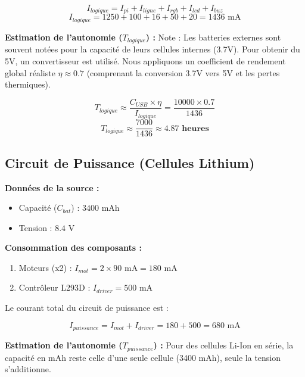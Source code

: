 \begin{equation}
    I_{logique} = I_{pi} + I_{ligne} + I_{rgb} + I_{lcd} + I_{buz}
\end{equation}
\begin{equation}
    I_{logique} = 1250 + 100 + 16 + 50 + 20 = 1436 \text{ mA}
\end{equation}

\textbf{Estimation de l'autonomie ($T_{logique}$) :}
Note : Les batteries externes sont souvent notées pour la capacité de leurs cellules internes (3.7V). Pour obtenir du 5V, un convertisseur est utilisé. Nous appliquons un coefficient de rendement global réaliste $\eta \approx 0.7$ (comprenant la conversion 3.7V vers 5V et les pertes thermiques).

\begin{equation}
    T_{logique} \approx \frac{C_{USB} \times \eta}{I_{logique}} = \frac{10000 \times 0.7}{1436}
\end{equation}
\begin{equation}
    T_{logique} \approx \frac{7000}{1436} \approx \mathbf{4.87 \text{ heures}}
\end{equation}

\subsection{Circuit de Puissance (Cellules Lithium)}

\textbf{Données de la source :}
\begin{itemize}
    \item Capacité ($C_{bat}$) : $3400 \text{ mAh}$
    \item Tension : $8.4 \text{ V}$
\end{itemize}

\textbf{Consommation des composants :}
\begin{enumerate}
    \item Moteurs (x2) : $I_{mot} = 2 \times 90 \text{ mA} = 180 \text{ mA}$
    \item Contrôleur L293D : $I_{driver} = 500 \text{ mA}$
\end{enumerate}

Le courant total du circuit de puissance est :

\begin{equation}
    I_{puissance} = I_{mot} + I_{driver} = 180 + 500 = 680 \text{ mA}
\end{equation}

\textbf{Estimation de l'autonomie ($T_{puissance}$) :}
Pour des cellules Li-Ion en série, la capacité en mAh reste celle d'une seule cellule (3400 mAh), seule la tension s'additionne.


